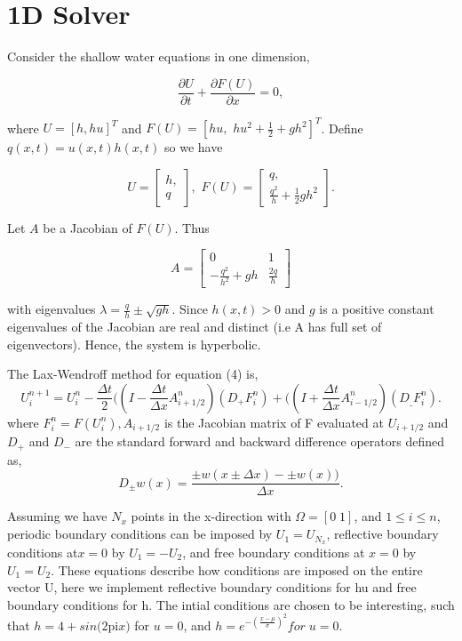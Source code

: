 \section{1D Solver}
\par Consider the shallow water equations in one dimension,

\begin{equation}
\frac{\partial U}{\partial t} + \frac{\partial F(U)}{\partial x} = 0,
\end{equation}

where $U = [h, hu]^T$ and $F(U) = [hu,\,\, hu^2 + \frac{1}{2} + gh^2]^T$. Define $q(x,t) = u(x,t) h(x,t)$ so we have

\[U = \begin{bmatrix} h, \\ q\end{bmatrix},\,\, F(U) = \begin{bmatrix} q,\\ \frac{q^2}{h} + \frac{1}{2} gh^2 \end{bmatrix}.\]

Let $A$ be a Jacobian of $F(U)$. Thus

\begin{equation}
A = \begin{bmatrix} 0 & 1 \\ -\frac{q^2}{h^2} + gh & \frac{2q}{h}\end{bmatrix}
\end{equation}

with eigenvalues $\lambda = \frac{q}{h} \pm \sqrt{gh}.$ Since $h(x,t) > 0$ and $g$ is a positive constant eigenvalues of the Jacobian are
real and distinct (i.e A has full set of eigenvectors). Hence, the system is hyperbolic. \newline

The Lax-Wendroff method for equation (4) is,
\begin{equation}\label{eqn:4}
U_i^{n+1}=U_i^n-\frac{{\Delta t}}{2}((I-\frac{{\Delta t}}{{\Delta x}}A_{i+1/2}^n)(D_+F_i^n)+((I+\frac{{\Delta
t}}{{\Delta x}}A_{i-1/2}^n)(D_{\_}F_i^n).
\end{equation}
where \(F_i^n=F(U_i^n), A_{i+1/2}\) is the Jacobian matrix of F evaluated at \(U_{i+1/2}\) and \(D_+\) and \(D_-\) are the standard forward
and backward difference operators defined as,
\begin{equation}\label{eqn:5}
D_{\pm }w(x)=\frac{\pm w(x\pm {\Delta x})-\pm w(x))}{{\Delta x}}. 
\end{equation}

Assuming we have \(N_x\) points in the x-direction with \(\Omega =[0\;1]\), and \(1\leq i\leq n\), periodic boundary
conditions can be imposed by \(U_1=U_{N_x}\), reflective boundary conditions at\(x=0\) by \(U_1=-U_2\), and free boundary conditions at \(x=0\) by
\(U_1=U_2\). These equations describe how conditions are imposed on the entire vector U, here we implement reflective boundary
conditions for hu and free boundary conditions for h. The intial conditions are chosen to be interesting, such that $h=4+sin(2$pi$x)$ for $u=0$, and
 $h=e^{-(\frac{x-\mu }{\sigma })^2}for \; u=0$. \newline

